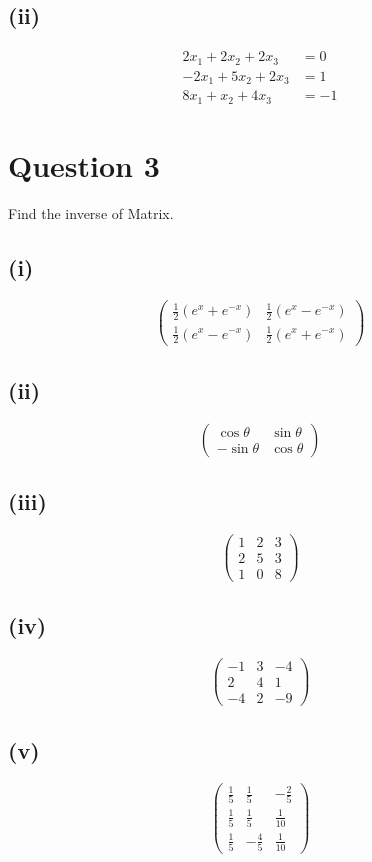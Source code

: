 \documentclass[12pt]{article}
\begin{document}
\subsection*{(ii)}
\begin{align*}
2x_1 + 2x_2 + 2x_3 &= 0\\
-2x_1 + 5x_2 + 2x_3 &= 1\\
8x_1 + x_2 + 4x_3 &= -1
\end{align*}

\section*{Question 3}
Find the inverse of Matrix.

\subsection*{(i)}
\[
\begin{pmatrix}
\frac{1}{2}(e^x + e^{-x}) & \frac{1}{2}(e^x - e^{-x})\\
\frac{1}{2}(e^x - e^{-x}) & \frac{1}{2}(e^x + e^{-x})
\end{pmatrix}
\]

\subsection*{(ii)}
\[
\begin{pmatrix}
\cos\theta & \sin\theta\\
-\sin\theta & \cos\theta
\end{pmatrix}
\]

\subsection*{(iii)}
\[
\begin{pmatrix}
1 & 2 & 3\\
2 & 5 & 3\\
1 & 0 & 8
\end{pmatrix}
\]

\subsection*{(iv)}
\[
\begin{pmatrix}
-1 & 3 & -4\\
2 & 4 & 1\\
-4 & 2 & -9
\end{pmatrix}
\]

\subsection*{(v)}
\[
\begin{pmatrix}
\frac{1}{5} & \frac{1}{5} & -\frac{2}{5}\\
\frac{1}{5} & \frac{1}{5} & \frac{1}{10}\\
\frac{1}{5} & -\frac{4}{5} & \frac{1}{10}
\end{pmatrix}
\]
\end{document}
